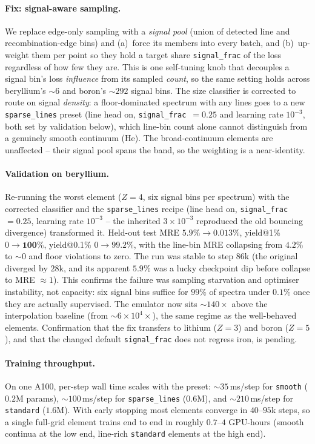 \documentclass[11pt,a4paper]{article}
\newcommand{\code}[1]{\texttt{#1}}
\begin{document}
\paragraph{Fix: signal-aware sampling.} We replace edge-only sampling
with a \emph{signal pool} (union of detected line and
recombination-edge bins) and (a)~force its members into every batch, and
(b)~up-weight them per point so they hold a target share
\code{signal\_frac} of the loss regardless of how few they are. This is
one self-tuning knob that decouples a signal bin's loss \emph{influence}
from its sampled \emph{count}, so the same setting holds across
beryllium's $\sim6$ and boron's $\sim292$ signal bins. The size
classifier is corrected to route on signal \emph{density}: a
floor-dominated spectrum with any lines goes to a new \code{sparse\_lines}
preset (line head on, \code{signal\_frac}~$=0.25$ and learning rate
$10^{-3}$, both set by validation below), which line-bin count
alone cannot distinguish from a genuinely smooth continuum (He). The
broad-continuum elements are unaffected -- their signal pool spans the
band, so the weighting is a near-identity.

\paragraph{Validation on beryllium.} Re-running the worst element
($Z=4$, six signal bins per spectrum) with the corrected classifier and
the \code{sparse\_lines} recipe (line head on, \code{signal\_frac}~$=0.25$,
learning rate $10^{-3}$ -- the inherited $3\times10^{-3}$ reproduced the
old bouncing divergence) transformed it. Held-out test MRE
$5.9\%\to\mathbf{0.013\%}$, yield@1\% $0\to\mathbf{100\%}$, yield@0.1\%
$0\to\mathbf{99.2\%}$, with the line-bin MRE collapsing from $4.2\%$ to
$\sim0$ and floor violations to zero. The run was stable to step $86$k
(the original diverged by $28$k, and its apparent $5.9\%$ was a lucky
checkpoint dip before collapse to MRE $\approx1$). This confirms the
failure was sampling starvation and optimiser instability, not
capacity: six signal bins suffice for $99\%$ of spectra under $0.1\%$
once they are actually supervised. The emulator now sits $\sim140\times$
above the interpolation baseline (from $\sim6\times10^{4}\times$), the
same regime as the well-behaved elements. Confirmation that the fix
transfers to lithium ($Z=3$) and boron ($Z=5$), and that the changed
default \code{signal\_frac} does not regress iron, is pending.

\paragraph{Training throughput.} On one A100, per-step wall time scales
with the preset: $\sim35$\,ms/step for \code{smooth} ($0.2$M params),
$\sim100$\,ms/step for \code{sparse\_lines} ($0.6$M), and
$\sim210$\,ms/step for \code{standard} ($1.6$M). With early stopping most
elements converge in $40$--$95$k steps, so a single full-grid element
trains end to end in roughly $0.7$--$4$ GPU-hours (smooth continua at the
low end, line-rich \code{standard} elements at the high end).
\end{document}
